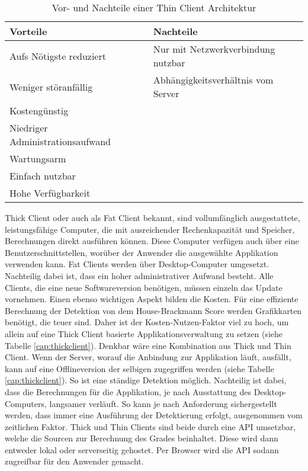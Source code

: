\begin{table}[b]\vspace{1ex}\centering
  \begin{tabular*}{14cm}{l|l}
  \textbf{Vorteile} & \textbf{Nachteile}
  \\\hline\hline
  Aufs Nötigste reduziert          & Nur mit Netzwerkverbindung nutzbar   \\
  Weniger störanfällig             & Abhängigkeitsverhältnis vom Server   \\
  Kostengünstig                    &                                      \\
  Niedriger Administrationsaufwand &                                      \\
  Wartungsarm                      &                                      \\
  Einfach nutzbar                  &                                      \\
  Hohe Verfügbarkeit               &
  \\\hline
  \end{tabular*}
  \caption[Vor- und Nachteile von Thin Client]{Vor- und Nachteile einer Thin Client Architektur}\label{cap:thinclient}
\vspace{1ex}\end{table}\label{table:thinclient}

\clearpage
Thick Client oder auch als Fat Client bekannt, sind vollumfänglich ausgestattete, leistungsfähige Computer, die mit ausreichender Rechenkapazität und Speicher, Berechnungen direkt ausführen können. Diese Computer verfügen auch über eine Benutzerschnittstellen, worüber der Anwender die ausgewählte Applikation verwenden kann. Fat Clients werden über Desktop-Computer umgesetzt. Nachteilig dabei ist, dass ein hoher administrativer Aufwand besteht. Alle Clients, die eine neue Softwareversion benötigen, müssen einzeln das Update vornehmen. Einen ebenso wichtigen Aspekt bilden die Kosten. Für eine effiziente Berechnung der Detektion von dem House-Brackmann Score werden Grafikkarten benötigt, die teuer sind. Daher ist der Kosten-Nutzen-Faktor viel zu hoch, um allein auf eine Thick Client basierte Applikationsverwaltung zu setzen (siehe Tabelle \ref{cap:thickclient}).
Denkbar wäre eine Kombination aus Thick und Thin Client. Wenn der Server, worauf die Anbindung zur Applikation läuft, ausfällt, kann auf eine Offlineversion der selbigen zugegriffen werden (siehe Tabelle \ref{cap:thickclient}). So ist eine ständige Detektion möglich. Nachteilig ist dabei, dass die Berechnungen für die Applikation, je nach Ausstattung des Desktop-Computers, langsamer verläuft. So kann je nach Anforderung sichergestellt werden, dass immer eine Ausführung der Detektierung erfolgt, ausgenommen vom zeitlichen Faktor. Thick und Thin Clients sind beide durch eine API umsetzbar, welche die Sourcen zur Berechnung des Grades beinhaltet. Diese wird dann entweder lokal oder serverseitig gehostet. Per Browser wird die API sodann zugreifbar für den Anwender gemacht.

